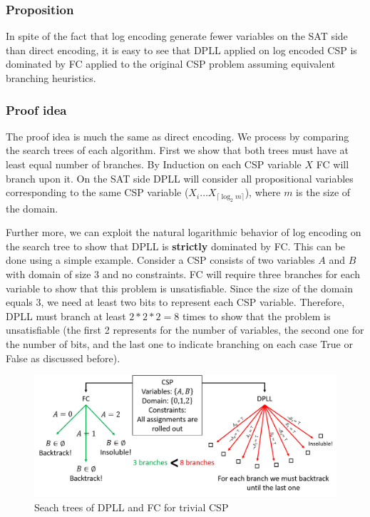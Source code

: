 \subsubsection{Proposition}\label{subsec:log_proposition}
In spite of the fact that log encoding generate fewer variables on the SAT side than direct encoding, it is easy to see that DPLL applied on log encoded CSP is dominated by FC applied to the original CSP problem assuming equivalent branching heuristics.

\subsubsection{Proof idea}
The proof idea is much the same as direct encoding. We process by comparing the search trees of each algorithm. First we show that both trees must have at least equal number of branches. By Induction on each CSP variable $X$ FC will branch upon it. On the SAT side DPLL will consider all propositional variables corresponding to the same CSP variable ($X_i \dots X_{\lceil \log_2 m \rceil}$), where $m$ is the size of the domain.

Further more, we can exploit the natural logarithmic behavior of log encoding on the search tree to show that DPLL is \textbf{strictly} dominated by FC. This can be done using a simple example. Consider a CSP consists of two variables $A$ and $B$ with domain of size 3 and no constraints. FC will require three branches for each variable to show that this problem is unsatisfiable. Since the size of the domain equals 3, we need at least two bits to represent each CSP variable. Therefore, DPLL must branch at least $2 * 2 * 2 = 8$ times to show that the problem is unsatisfiable (the first 2 represents for the number of variables, the second one for the number of bits, and the last one to indicate branching on each case True or False as discussed before).

\begin{figure}[H]
	\centering
	\includegraphics[width=0.85\linewidth]{assets/log_dominated_by_fc}
	\captionsetup{justification=centering,margin=2cm}
	\caption{Seach trees of DPLL and FC for trivial CSP}
	\label{fig:log_dominated_by_fc}
\end{figure}



